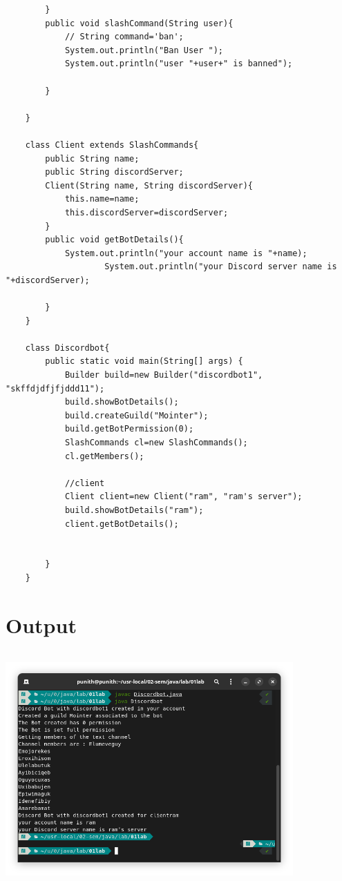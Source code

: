 \documentclass{article}
\begin{document}
\begin{lstlisting}
        }
        public void slashCommand(String user){
            // String command='ban';
            System.out.println("Ban User ");
            System.out.println("user "+user+" is banned");
    
        }
    
    }
    
    class Client extends SlashCommands{
        public String name;
        public String discordServer;
        Client(String name, String discordServer){
            this.name=name;
            this.discordServer=discordServer;
        }
        public void getBotDetails(){
            System.out.println("your account name is "+name);
                    System.out.println("your Discord server name is "+discordServer);
    
        }
    }
    
    class Discordbot{
        public static void main(String[] args) {
            Builder build=new Builder("discordbot1", "skffdjdfjfjddd11");
            build.showBotDetails();
            build.createGuild("Mointer");
            build.getBotPermission(0);
            SlashCommands cl=new SlashCommands();
            cl.getMembers();
    
            //client
            Client client=new Client("ram", "ram's server");
            build.showBotDetails("ram");
            client.getBotDetails();
    
    
        }
    }
\end{lstlisting}

\section*{Output}
\includegraphics[width=11cm, height=9cm]{./images/01.png}
\end{document}
